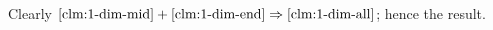 Clearly $\text{\ref{clm:1-dim-mid}}+\text{\ref{clm:1-dim-end}}\Rightarrow\text{\ref{clm:1-dim-all}}$;
hence the result.
\qeds

\begin{comment}
\parit{Proof 2.}
According to \ref{LinDim+-f}, there is a point $p\in\spc{L}$, such that $\T_p\iso\RR$;
that is, $\Sigma_p$ consists of two directions $\xi_+$, $\xi_-$ on angle $\pi$.
Both of directions $\xi_+$, $\xi_-$ have to be geodesic;
otherwise the set of geodesic directions $\Sigma_p'$ would not be dense in $\Sigma_p$.
Let $\gamma_+$ and $\gamma_-$ be maximal geodesics in directions $\xi_+$ and $\xi_-$ correspondingly.

The geodesics $\gamma_+$ and $\gamma_-$ cover $\spc{L}$ completely;
that follows sinse $\spc{L}$ is geodesic (\ref{cor:dim>proper}) and since geodesics in $\spc{L}$ do not bifurcate (\ref{thm:g-split}).
It is easy to see that only following cases can occur
\begin{itemize}
\item both $\gamma_+$ and $\gamma_-$ are defined on $[0,\infty)$.
In this case $\spc{L}\iso\RR$.
\item $\gamma_+$ is defined on closed interval, say $[0,a]$ and $\gamma_-$ is defined of an infinite interval $[0,\infty)$ (or vise versa).
In this case $\spc{L}\iso\RR_{\ge0}$.
\item both $\gamma_+$ and $\gamma_-$ are defined on closed intervals, say $[0,a]$ and $[0,b]$ and $\gamma_+(a)\not=\gamma_-(b)$.
In this case $\spc{L}\iso[0,a+b]$.
\item both $\gamma_+$ and $\gamma_-$ are defined on one closed interval, say $[0,a]$ and $\gamma_+(a)=\gamma_-(a)$.
In this case, $\spc{L}\iso\tfrac{a}{\pi}\blow\mathbb{S}^1$.
\end{itemize}
Hence the result.\qeds
\end{comment}











